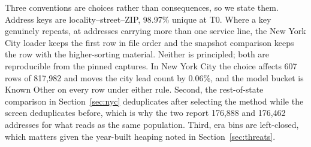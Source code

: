 \documentclass[11pt]{article}
\newcommand{\KO}{\textsf{Known Other}}
\begin{document}
Three conventions are choices rather than consequences, so we state them. Address keys are
\mbox{locality}--\mbox{street}--\mbox{ZIP}, 98.97\% unique at T0. Where a key genuinely
repeats, at addresses carrying more than one service line, the New York City loader keeps the
first row in file order and the snapshot comparison keeps the row with the higher-sorting
material. Neither is principled; both are reproducible from the pinned captures. In New York
City the choice affects 607 rows of 817,982 and moves the city lead count by 0.06\%, and the
model bucket is \KO{} on every row under either rule. Second, the rest-of-state comparison in
Section~\ref{sec:nyc} deduplicates after selecting the method while the screen deduplicates
before, which is why the two report 176,888 and 176,462 addresses for what reads as the same
population. Third, era bins are left-closed, which matters given the year-built heaping noted
in Section~\ref{sec:threats}.



\end{document}
